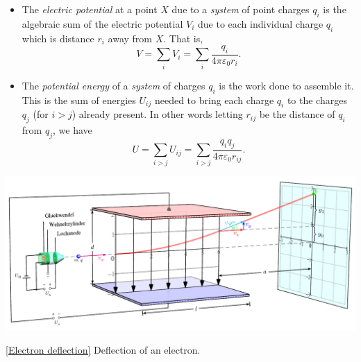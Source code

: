 \documentclass[oneside]{book}
\begin{document}
\begin{itemize}
\begin{center}
  \end{center}
  \item The \emph{electric potential} at a point \(X\) due to a \emph{system} of point charges \(q_i\) is the algebraic sum of the electric potential \(V_i\) due to each individual charge \(q_i\) which is distance \(r_i\) away from \(X\). That is, 
  \[V=\sum_{i}{V_i}=\sum_{i}^{}{\frac{q_i}{4\pi\varepsilon_0r_i}}.\]
  \item The \emph{potential energy} of a \emph{system} of charges \(q_i\) is the work done to assemble it. This is the sum of energies \(U_{ij}\) needed to bring each charge \(q_i\) to the charges \(q_j\) (for \(i>j\)) already present. In other words letting \(r_{ij}\) be the distance of \(q_i\) from \(q_j\), we have 
  \[U=\sum_{i>j}{U_{ij}}=\sum_{i>j}^{}{\frac{q_iq_j}{4\pi\varepsilon_0r_{ij}}}.\] 
\end{itemize}
\begin{center}
    \includegraphics[width=\textwidth]{../images/Electron-Deflection/Bahn-Kondensator (1).pdf}
    \captionsetup{type=figure}
    \caption[figure]{\ref{Electron deflection} Deflection of an electron.}
\end{center}
\end{document}
